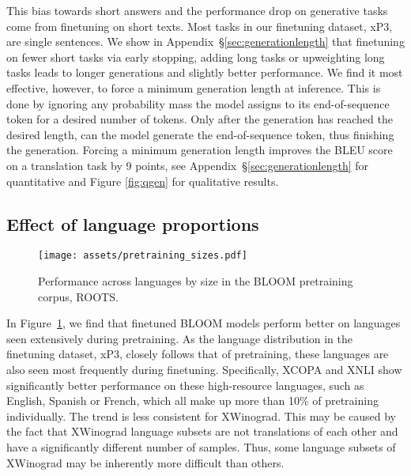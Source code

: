 \documentclass[11pt]{article}
\begin{document}
This bias towards short answers and the performance drop on generative tasks come from finetuning on short texts. Most tasks in our finetuning dataset, xP3, are single sentences. We show in Appendix~\S\ref{sec:generationlength} that finetuning on fewer short tasks via early stopping, adding long tasks or upweighting long tasks leads to longer generations and slightly better performance. We find it most effective, however, to force a minimum generation length at inference. This is done by ignoring any probability mass the model assigns to its end-of-sequence token for a desired number of tokens. Only after the generation has reached the desired length, can the model generate the end-of-sequence token, thus finishing the generation. Forcing a minimum generation length improves the BLEU score on a translation task by 9 points, see Appendix~\S\ref{sec:generationlength} for quantitative and Figure \ref{fig:qgen} for qualitative results.




















\subsection{Effect of language proportions}
\label{sec:corpus}

\begin{figure}[t]
    \centering
    \texttt{[image: assets/pretraining\_sizes.pdf]}
    \caption{Performance across languages by size in the BLOOM pretraining corpus, ROOTS.}
    \label{fig:langscale}
\end{figure}

In Figure~\ref{fig:langscale}, we find that finetuned BLOOM models perform better on languages seen extensively during pretraining. As the language distribution in the finetuning dataset, xP3, closely follows that of pretraining, these languages are also seen most frequently during finetuning. Specifically, XCOPA and XNLI show significantly better performance on these high-resource languages, such as English, Spanish or French, which all make up more than 10\% of pretraining individually. The trend is less consistent for XWinograd. This may be caused by the fact that XWinograd language subsets are not translations of each other and have a significantly different number of samples. Thus, some language subsets of XWinograd may be inherently more difficult than others.
\end{document}
